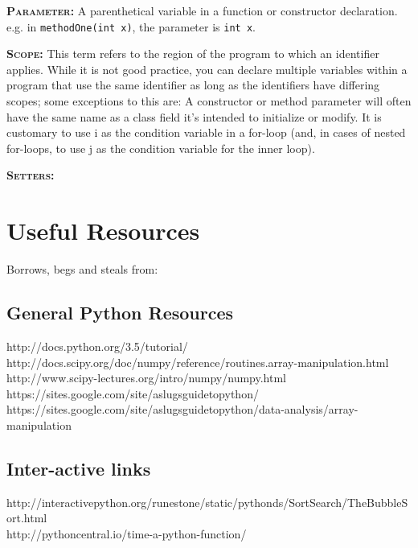 \documentclass[11pt,a4paper]{article}
\begin{document}
\smallskip \smallskip
\noindent \textbf{\textsc{Parameter:}} A parenthetical variable in a
function or constructor declaration. e.g. in {\tt methodOne(int x)},
the parameter is {\tt int x}.

\smallskip \smallskip
\noindent \textbf{\textsc{Scope:}} This term refers to the region of
the program to which an identifier applies. While it is not good
practice, you can declare multiple variables within a program that use
the same identifier as long as the identifiers have differing scopes;
some exceptions to this are: A constructor or method parameter will
often have the same name as a class field it's intended to initialize
or modify.  It is customary to use i as the condition variable in a
for-loop (and, in cases of nested for-loops, to use j as the condition
variable for the inner loop).

\smallskip \smallskip
\noindent \textbf{\textsc{Setters:}}





\newpage
\section{Useful Resources}
Borrows, begs and steals from: \\

\subsection*{General Python Resources}
http://docs.python.org/3.5/tutorial/\\
http://docs.scipy.org/doc/numpy/reference/routines.array-manipulation.html\\
http://www.scipy-lectures.org/intro/numpy/numpy.html\\
https://sites.google.com/site/aslugsguidetopython/\\
https://sites.google.com/site/aslugsguidetopython/data-analysis/array-manipulation\\

\subsection*{Inter-active links}
http://interactivepython.org/runestone/static/pythonds/SortSearch/TheBubbleSort.html\\
http://pythoncentral.io/time-a-python-function/\\
\end{document}
